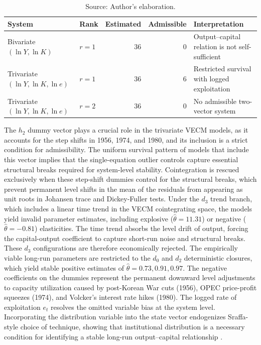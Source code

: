 \documentclass[11pt]{article}
\begin{document}
\begin{table}[H]
\centering
\caption{S2 System Admissibility Outcomes}
\label{tab:s2_admissibility_outcomes}
\small
\begin{tabular}{llrrp{5.0cm}}
\toprule
System & Rank & Estimated & Admissible & Interpretation \\
\midrule
\midrule
Bivariate $(\ln Y,\ln K)$ & $r=1$ & 36 & 0 & Output--capital relation is not self-sufficient \\
Trivariate $(\ln Y,\ln K,\ln e)$ & $r=1$ & 36 & 6 & Restricted survival with logged exploitation \\
Trivariate $(\ln Y,\ln K,\ln e)$ & $r=2$ & 36 & 0 & No admissible two-vector system \\
\bottomrule
\end{tabular}
\caption*{Source: Author's elaboration.}
\end{table}

The $h_2$ dummy vector plays a crucial role in the trivariate VECM models, as it accounts for the step shifts in 1956, 1974, and 1980, and its inclusion is a strict condition for admissibility. The uniform survival pattern of models that include this vector implies that the single-equation outlier controls capture essential structural breaks required for system-level stability. Cointegration is rescued exclusively when these step-shift dummies control for the structural breaks, which prevent permanent level shifts in the mean of the residuals from appearing as unit roots in Johansen trace and Dickey-Fuller tests. Under the $d_3$ trend branch, which includes a linear time trend in the VECM cointegrating space, the models yield invalid parameter estimates, including explosive ($\hat{\theta} = 11.31$) or negative ($\hat{\theta} = -0.81$) elasticities. The time trend absorbs the level drift of output, forcing the capital-output coefficient to capture short-run noise and structural breaks. These $d_3$ configurations are therefore economically rejected. The empirically viable long-run parameters are restricted to the $d_0$ and $d_2$ deterministic closures, which yield stable positive estimates of $\hat{\theta} = 0.73, 0.91, 0.97$. The negative coefficients on the dummies represent the permanent downward level adjustments to capacity utilization caused by post-Korean War cuts (1956), OPEC price-profit squeezes (1974), and Volcker's interest rate hikes (1980). The logged rate of exploitation $e_t$ resolves the omitted variable bias at the system level. Incorporating the distribution variable into the state vector endogenizes Sraffa-style choice of technique, showing that institutional distribution is a necessary condition for identifying a stable long-run output--capital relationship \citep{Kurz1986}.
\end{document}
